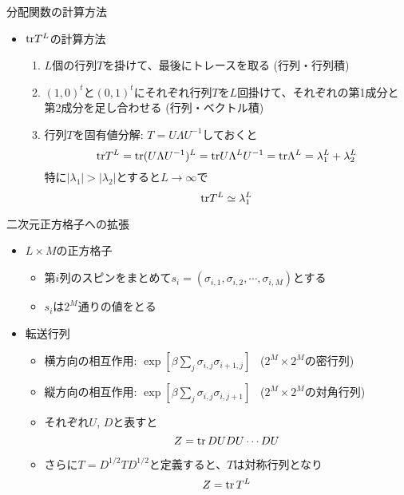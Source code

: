 \documentclass[dvipdfmx]{beamer}
\begin{document}
\begin{frame}[t,fragile]{分配関数の計算方法}
  \begin{itemize}
    \setlength{\itemsep}{1em}
  \item ${\rm tr} T^L$の計算方法
    \begin{enumerate}
    \item $L$個の行列$T$を掛けて、最後にトレースを取る (行列・行列積)
    \item $(1,0)^t$と$(0,1)^t$にそれぞれ行列$T$を$L$回掛けて、それぞれの第1成分と第2成分を足し合わせる (行列・ベクトル積)
    \item 行列$T$を固有値分解: $T = U\Lambda U^{-1}$しておくと
      \[
        {\rm tr} T^L = {\rm tr} (U \Lambda U^{-1})^L = {\rm tr} U \Lambda^L U^{-1} = {\rm tr} \Lambda^L = \lambda_1^L + \lambda_2^L
        \]
        特に$|\lambda_1| > |\lambda_2|$とすると$L\rightarrow\infty$で
        \[
          {\rm tr} T^L \simeq \lambda_1^L
          \]
    \end{enumerate}
  \end{itemize}
\end{frame}

\begin{frame}[t,fragile]{二次元正方格子への拡張}
  \begin{itemize}
    \setlength{\itemsep}{1em}
  \item $L \times M$の正方格子
    \begin{itemize}
    \item 第$i$列のスピンをまとめて$s_i = ( \sigma_{i,1}, \sigma_{i,2}, \cdots, \sigma_{i,M})$とする
    \item $s_i$は$2^M$通りの値をとる
    \end{itemize}
  \item 転送行列
    \begin{itemize}
    \item 横方向の相互作用: $\exp[\beta \sum_j \sigma_{i,j} \sigma_{i+1,j}]$ \ ($2^M \times 2^M$の密行列)
    \item 縦方向の相互作用: $\exp[\beta \sum_j \sigma_{i,j} \sigma_{i,j+1}]$ \ ($2^M \times 2^M$の対角行列)
    \item それぞれ$U$, $D$と表すと
      \[
      Z = {\rm tr} \, DUDU \cdots DU
      \]
    \item さらに$T=D^{1/2}TD^{1/2}$と定義すると、$T$は対称行列となり
      \[
      Z = {\rm tr} \, T^L
      \]
    \end{itemize}
  \end{itemize}
\end{frame}
\end{document}
